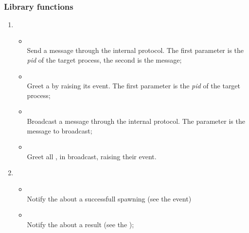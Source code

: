     \subsubsection{Library functions}

        \begin{enumerate}
            \item   {}
                \begin{itemize}
                \item {} \\
                    Send a message through the internal protocol. The
                    first parameter is the \emph{pid} of the target
                    process, the second is the message;

                \item {} \\
                    Greet a  by raising its
                     event. The first
                    parameter is the \emph{pid} of the target process;

                \item {} \\
                    Broadcast a message through the internal protocol. The
                    parameter is the message to broadcast;

                \item {} \\
                    Greet all , in broadcast, raising their
                     event.

                \end{itemize}

            \item   {}
                \begin{itemize}
                \item {} \\
                    Notify the  about a successfull
                    spawning (see the 
                    event)

                \item {} \\
                    Notify the  about a result
                    (see the );


\end{itemize}
\end{enumerate}
